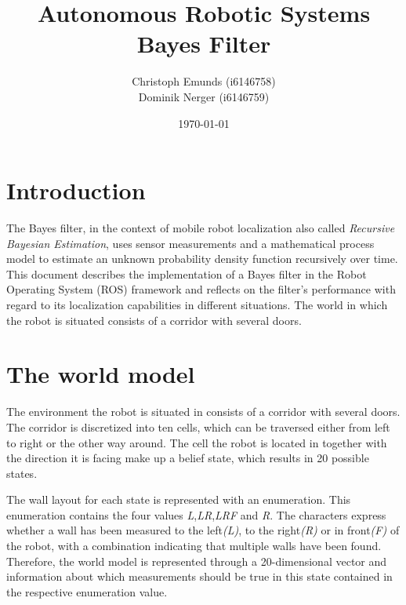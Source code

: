 \documentclass[10pt,a4paper]{article}
\author{Christoph Emunds (i6146758)\\Dominik Nerger (i6146759)}
\title{Autonomous Robotic Systems\\Bayes Filter}
\date{\today}
\begin{document}
	\maketitle
	
	\tableofcontents
	
	\section{Introduction}
	The Bayes filter, in the context of mobile robot localization also called \textit{Recursive Bayesian Estimation}, uses sensor measurements and a mathematical process model to estimate an unknown probability density function recursively over time.	This document describes the implementation of a Bayes filter in the Robot Operating System (ROS) framework and reflects on the filter's performance with regard to its localization capabilities in different situations. The world in which the robot is situated consists of a corridor with several doors.
	
		
	\section{The world model}
	The environment the robot is situated in consists of a corridor with several doors. The corridor is discretized into ten cells, which can be traversed either from left to right or the other way around. The cell the robot is located in together with the direction it is facing make up a belief state, which results in 20 possible states.
	
	
	The wall layout for each state is represented with an enumeration. This enumeration contains the four values \textit{L},\textit{LR},\textit{LRF} and \textit{R}. The characters express whether a wall has been measured to the left\textit{(L)}, to the right\textit{(R)} or in front\textit{(F)} of the robot, with a combination indicating that multiple walls have been found. Therefore, the world model is represented through a 20-dimensional vector and information about which measurements should be true in this state contained in the respective enumeration value.
	
\end{document}
